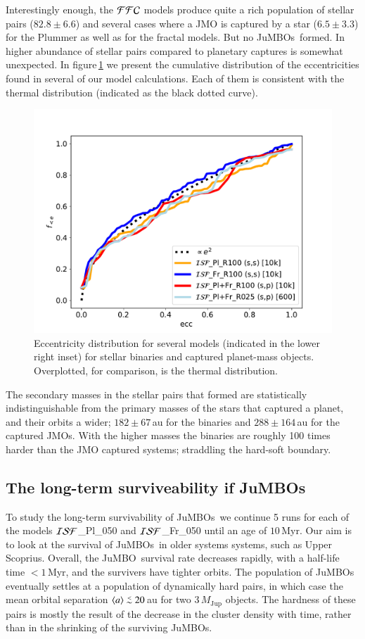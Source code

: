 \documentclass[submission,phys]{lib/SciPost}
\def\aplt{\ {\raise-.5ex\hbox{$\buildrel<\over\sim$}}\ }
\newcommand{\jumbo}{\mbox{JuMBO}}
\newcommand{\jumbos}{\mbox{JuMBOs}}
\begin{document}
Interestingly enough, the ${\cal FFC}$ models produce quite a rich
population of stellar pairs ($82.8\pm 6.6$) and several cases where a
JMO is captured by a star ($6.5\pm3.3$) for the Plummer as well as for
the fractal models. But no \jumbos\, formed. In higher abundance of
stellar pairs compared to planetary captures is somewhat unexpected.
In figure\,\ref{Fig:eccentricity_FFC_Fr025} we present the cumulative
distribution of the eccentricities found in several of our model
calculations. Each of them is consistent with the thermal distribution
(indicated as the black dotted curve).

\begin{figure}
    \centering
        \includegraphics[width=0.75\columnwidth]{figures/fig_eccentricity_FFC.pdf}
        \caption{Eccentricity distribution for several models
          (indicated in the lower right inset) for stellar binaries and
          captured planet-mass objects. Overplotted, for comparison,
          is the thermal distribution.}
         \label{Fig:eccentricity_FFC_Fr025}
\end{figure}

The secondary masses in the stellar pairs that formed are
statistically indistinguishable from the primary masses of the stars
that captured a planet, and their orbits a wider; $182\pm67$\,au for
the binaries and $288\pm164$\,au for the captured JMOs.  With the
higher masses the binaries are roughly 100 times harder than the JMO
captured systems; straddling the hard-soft boundary.

\subsection{The long-term surviveability if \jumbos}

To study the long-term survivability of \jumbos\, we continue 5 runs
for each of the models ${\cal ISF}$\_Pl\_050 and ${\cal ISF}$\_Fr\_050
until an age of $10$\,Myr.  Our aim is to look at the survival of
\jumbos\, in older systems systems, such as Upper Scoprius. Overall,
the \jumbo\, survival rate decreases rapidly, with a half-life time
$<1$\,Myr, and the survivers have tighter orbits.  The population of
\jumbos\, eventually settles at a population of dynamically hard
pairs, in which case the mean orbital separation $\langle a\rangle
\aplt 20$\,au for two $3\, M_{\mathrm{Jup}}$ objects. The hardness of
these pairs is mostly the result of the decrease in the cluster
density with time, rather than in the shrinking of the surviving
\jumbos.
\end{document}
